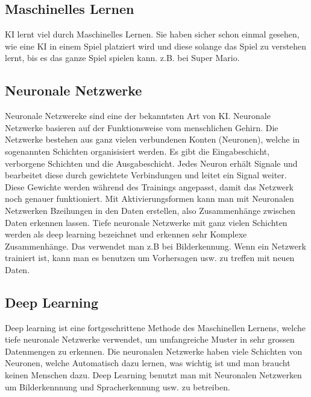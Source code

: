 \documentclass{report}
\begin{document}
\subsection{Maschinelles Lernen}
KI lernt viel durch Maschinelles Lernen. Sie haben sicher schon einmal gesehen, wie eine KI in einem Spiel platziert wird und diese solange
das Spiel zu verstehen lernt, bis es das ganze Spiel spielen kann. z.B. bei Super Mario.

\subsection{Neuronale Netzwerke}
Neuronale Netzwereke sind eine der bekanntsten Art von KI. Neuronale Netzwerke basieren auf der Funktionsweise vom menschlichen Gehirn. Die Netzwerke bestehen aus ganz vielen verbundenen Konten (Neuronen), welche in sogenannten Schichten organisisiert werden. 
Es gibt die Eingabeschicht, verborgene Schichten und die Ausgabeschicht. Jedes Neuron erhält Signale und bearbeitet diese durch gewichtete Verbindungen und leitet ein Signal weiter. Diese Gewichte werden während des Trainings angepasst, damit das Netzwerk noch genauer funktioniert.
 Mit Aktivierungsformen kann man mit Neuronalen Netzwerken Bzeihungen in den Daten erstellen, also Zusammenhänge zwischen Daten erkennen lassen. Tiefe neuronale Netzwerke mit ganz vielen Schichten werden als deep learning bezeichnet und erkennen sehr Komplexe Zusammenhänge. 
 Das verwendet man z.B bei Bilderkennung. Wenn ein Netzwerk trainiert ist, kann man es benutzen um Vorhersagen usw. zu treffen mit neuen Daten.

\subsection{Deep Learning}
Deep learning ist eine fortgeschrittene Methode des Maschinellen Lernens, welche tiefe neuronale Netzwerke verwendet, um umfangreiche Muster in sehr grossen Datenmengen zu erkennen. Die neuronalen Netzwerke haben viele Schichten von Neuronen, welche Automatisch dazu lernen, was wichtig ist und man braucht keinen Menschen dazu. Deep Learning benutzt man mit Neuronalen Netzwerken um Bilderkennnung und Spracherkennung usw. zu betreiben.
\end{document}
